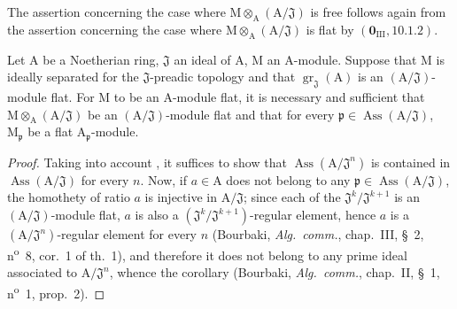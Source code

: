The assertion concerning the case where $\mathrm{M}\otimes_\mathrm{A}(\mathrm{A}/\mathfrak{J})$ is free follows again from the assertion concerning the case where $\mathrm{M}\otimes_\mathrm{A}(\mathrm{A}/\mathfrak{J})$ is flat by $(\mathbf{0}_{\mathrm{III}},10.1.2)$.

\begin{corollary}[11.4.10]
\label{IV.11.4.10}
Let $\mathrm{A}$ be a Noetherian ring, $\mathfrak{J}$ an ideal of $\mathrm{A}$, $\mathrm{M}$ an $\mathrm{A}$-module.
Suppose that $\mathrm{M}$ is ideally separated for the $\mathfrak{J}$-preadic topology and that $\operatorname{gr}_\mathfrak{J}(\mathrm{A})$ is an
$(\mathrm{A}/\mathfrak{J})$-module flat. For $\mathrm{M}$ to be an $\mathrm{A}$-module flat, it is necessary and sufficient that $\mathrm{M}\otimes_\mathrm{A}(\mathrm{A}/\mathfrak{J})$ be
an $(\mathrm{A}/\mathfrak{J})$-module flat and that for every $\mathfrak{p}\in\operatorname{Ass}(\mathrm{A}/\mathfrak{J})$, $\mathrm{M}_\mathfrak{p}$ be a flat $\mathrm{A}_\mathfrak{p}$-module.
\end{corollary}

\begin{proof}
Taking into account , it suffices to show that $\operatorname{Ass}(\mathrm{A}/\mathfrak{J}^n)$ is contained in
$\operatorname{Ass}(\mathrm{A}/\mathfrak{J})$ for every $n$. Now, if $a\in\mathrm{A}$ does not belong to any $\mathfrak{p}\in\operatorname{Ass}(\mathrm{A}/\mathfrak{J})$, the homothety
of ratio $a$ is injective in $\mathrm{A}/\mathfrak{J}$; since each of the $\mathfrak{J}^k/\mathfrak{J}^{k+1}$ is an $(\mathrm{A}/\mathfrak{J})$-module
flat, $a$ is also a $(\mathfrak{J}^k/\mathfrak{J}^{k+1})$-regular element, hence $a$ is a $(\mathrm{A}/\mathfrak{J}^n)$-regular element for every $n$
(Bourbaki, \emph{Alg.\ comm.}, chap.~III, \S~2, n\textsuperscript{o}~8, cor.~1 of th.~1), and therefore it does not belong
to any prime ideal associated to $\mathrm{A}/\mathfrak{J}^n$, whence the corollary (Bourbaki, \emph{Alg.\ comm.}, chap.~II,
\S~1, n\textsuperscript{o}~1, prop.~2).
\end{proof}

